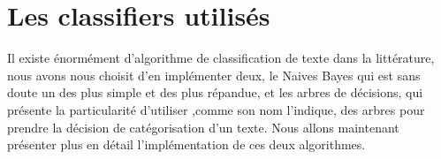 \section{Les classifiers utilisés}
Il existe énormément d'algorithme de classification de texte dans la littérature, nous avons nous choisit d'en implémenter deux, le Naives Bayes qui est sans doute un des plus simple et des plus répandue, et les arbres de décisions, qui présente la particularité d'utiliser ,comme son nom l'indique, des arbres pour prendre la décision de catégorisation d'un texte. Nous allons maintenant présenter plus en détail l'implémentation de ces deux algorithmes.